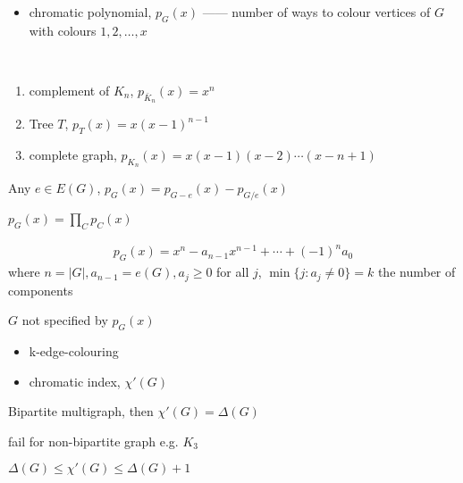 \begin{itemize}
    \item chromatic polynomial, $p_G(x)$ ------ number of ways to colour vertices of $G$ with colours $1, 2, \dots, x$
\end{itemize}

\begin{example}
    \,
    \begin{enumerate}
        \item complement of $K_n$, $p_{\bar K_n}(x) = x^n$
        \item Tree $T$, $p_T(x) = x(x-1)^{n-1}$
        \item complete graph, $p_{K_n}(x) = x(x - 1)(x - 2)\cdots(x - n + 1)$
    \end{enumerate}
\end{example}

\begin{thm}
    Any $e \in E(G)$, $p_G(x) = p_{G-e}(x) - p_{G/e}(x)$
\end{thm}

\begin{fact}
    $p_G(x) = \prod_C p_C(x)$
\end{fact}

\begin{cor}
    \begin{align*}
        p_G(x) = x^n - a_{n-1} x^{n-1} + \cdots + (-1)^n a_0
    \end{align*}
    where $n = |G|, a_{n-1} = e(G), a_j \geq 0$ for all $j$, $\min\{j: a_j \neq 0\} = k$ the number of components
\end{cor}

\begin{fact}
    $G$ not specified by $p_G(x)$
\end{fact}

\begin{itemize}
    \item k-edge-colouring
    \item chromatic index, $\chi'(G)$
\end{itemize}

\begin{thm}
    Bipartite multigraph, then $\chi'(G) = \Delta(G)$
\end{thm}

\begin{fact}
    fail for non-bipartite graph e.g. $K_3$
\end{fact}

\begin{thm}[Vizing]
    $\Delta(G) \leq \chi'(G) \leq \Delta(G) + 1$
\end{thm}

